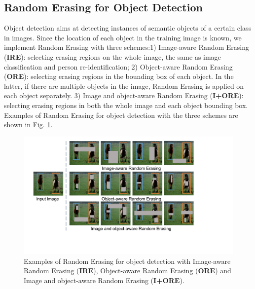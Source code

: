 \documentclass[10pt,twocolumn,letterpaper]{article}
\begin{document}
\subsection{Random Erasing for Object Detection}
Object detection aims at detecting instances of semantic objects of a certain class in images. Since the location of each object in the training image is known, we implement Random Erasing with three schemes:1) Image-aware Random Erasing (\textbf{IRE}): selecting erasing regions on the whole image, the same as image classification and person re-identification; 2) Object-aware Random Erasing (\textbf{ORE}): selecting erasing regions in the bounding box of each object. In the latter, if there are multiple objects in the image, Random Erasing is applied on each object separately. 3) Image and object-aware Random Erasing (\textbf{I+ORE}): selecting erasing regions in both the whole image and each object bounding box. Examples of Random Erasing for object detection with the three schemes are shown in Fig. \ref{fig:example_detection}. 

\begin{figure}[!t]
\centering
\includegraphics[width=0.9\linewidth]{img/example_detection}
\caption{Examples of Random Erasing for object detection with Image-aware Random Erasing (\textbf{IRE}), Object-aware Random Erasing (\textbf{ORE}) and Image and object-aware Random Erasing (\textbf{I+ORE}).}
\label{fig:example_detection}
\end{figure}
\end{document}
